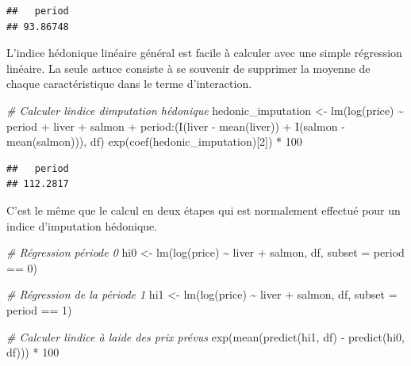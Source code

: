 \documentclass[
]{article}
\newenvironment{Shaded}{\begin{snugshade}}{\end{snugshade}}
\newcommand{\AttributeTok}[1]{\textcolor[rgb]{0.77,0.63,0.00}{#1}}
\newcommand{\CommentTok}[1]{\textcolor[rgb]{0.56,0.35,0.01}{\textit{#1}}}
\newcommand{\DecValTok}[1]{\textcolor[rgb]{0.00,0.00,0.81}{#1}}
\newcommand{\FunctionTok}[1]{\textcolor[rgb]{0.00,0.00,0.00}{#1}}
\newcommand{\NormalTok}[1]{#1}
\newcommand{\OtherTok}[1]{\textcolor[rgb]{0.56,0.35,0.01}{#1}}
\newcommand{\SpecialCharTok}[1]{\textcolor[rgb]{0.00,0.00,0.00}{#1}}
\begin{document}
\begin{verbatim}
##   period 
## 93.86748
\end{verbatim}

L'indice hédonique linéaire général est facile à calculer avec une simple régression linéaire. La seule astuce consiste à se souvenir de supprimer la moyenne de chaque caractéristique dans le terme d'interaction.

\begin{Shaded}
\begin{Highlighting}[]
\CommentTok{\# Calculer l\textquotesingle{}indice d\textquotesingle{}imputation hédonique}
\NormalTok{hedonic\_imputation }\OtherTok{\textless{}{-}} \FunctionTok{lm}\NormalTok{(}\FunctionTok{log}\NormalTok{(price) }\SpecialCharTok{\textasciitilde{}}\NormalTok{ period }\SpecialCharTok{+}\NormalTok{ liver }\SpecialCharTok{+}\NormalTok{ salmon }\SpecialCharTok{+} 
\NormalTok{                           period}\SpecialCharTok{:}\NormalTok{(}\FunctionTok{I}\NormalTok{(liver }\SpecialCharTok{{-}} \FunctionTok{mean}\NormalTok{(liver)) }\SpecialCharTok{+} \FunctionTok{I}\NormalTok{(salmon }\SpecialCharTok{{-}} \FunctionTok{mean}\NormalTok{(salmon))), }
\NormalTok{                         df)}
\FunctionTok{exp}\NormalTok{(}\FunctionTok{coef}\NormalTok{(hedonic\_imputation)[}\DecValTok{2}\NormalTok{]) }\SpecialCharTok{*} \DecValTok{100}
\end{Highlighting}
\end{Shaded}

\begin{verbatim}
##   period 
## 112.2817
\end{verbatim}

C'est le même que le calcul en deux étapes qui est normalement effectué pour un indice d'imputation hédonique.

\begin{Shaded}
\begin{Highlighting}[]
\CommentTok{\# Régression période 0}
\NormalTok{hi0 }\OtherTok{\textless{}{-}} \FunctionTok{lm}\NormalTok{(}\FunctionTok{log}\NormalTok{(price) }\SpecialCharTok{\textasciitilde{}}\NormalTok{ liver }\SpecialCharTok{+}\NormalTok{ salmon, df, }\AttributeTok{subset =}\NormalTok{ period }\SpecialCharTok{==} \DecValTok{0}\NormalTok{)}

\CommentTok{\# Régression de la période 1}
\NormalTok{hi1 }\OtherTok{\textless{}{-}} \FunctionTok{lm}\NormalTok{(}\FunctionTok{log}\NormalTok{(price) }\SpecialCharTok{\textasciitilde{}}\NormalTok{ liver }\SpecialCharTok{+}\NormalTok{ salmon, df, }\AttributeTok{subset =}\NormalTok{ period }\SpecialCharTok{==} \DecValTok{1}\NormalTok{)}

\CommentTok{\# Calculer l\textquotesingle{}indice à l\textquotesingle{}aide des prix prévus}
\FunctionTok{exp}\NormalTok{(}\FunctionTok{mean}\NormalTok{(}\FunctionTok{predict}\NormalTok{(hi1, df) }\SpecialCharTok{{-}} \FunctionTok{predict}\NormalTok{(hi0, df))) }\SpecialCharTok{*} \DecValTok{100}
\end{Highlighting}
\end{Shaded}
\end{document}
